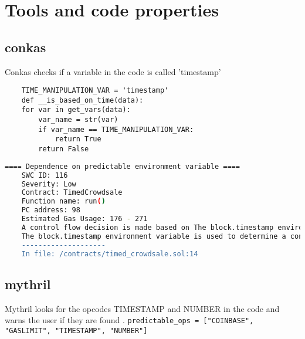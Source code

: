 \section{Tools and code properties}

\subsection{conkas}
Conkas checks if a variable in the code is called 'timestamp' \cite{conkas_opcodes} \newline
\begin{lstlisting}
    TIME_MANIPULATION_VAR = 'timestamp'
    def __is_based_on_time(data):
    for var in get_vars(data):
        var_name = str(var)
        if var_name == TIME_MANIPULATION_VAR:
            return True
        return False
\end{lstlisting}

\begin{lstlisting}[language=bash, caption="conkas output for the timed\_crowdsale.sol contract"]
    ==== Dependence on predictable environment variable ====
    SWC ID: 116
    Severity: Low
    Contract: TimedCrowdsale
    Function name: run()
    PC address: 98
    Estimated Gas Usage: 176 - 271
    A control flow decision is made based on The block.timestamp environment variable.
    The block.timestamp environment variable is used to determine a control flow decision. Note that the values of variables like coinbase, gaslimit, block number and timestamp are predictable and can be manipulated by a malicious miner. Also keep in mind that attackers know hashes of earlier blocks. Don't use any of those environment variables as sources of randomness and be aware that use of these variables introduces a certain level of trust into miners.
    --------------------
    In file: /contracts/timed_crowdsale.sol:14    
\end{lstlisting}

\subsection{mythril}
Mythril looks for the opcodes TIMESTAMP and NUMBER in the code and warns the user if they are found \cite{mythril_opcodes}. \newline
\verb|predictable_ops = ["COINBASE", "GASLIMIT", "TIMESTAMP", "NUMBER"]|

